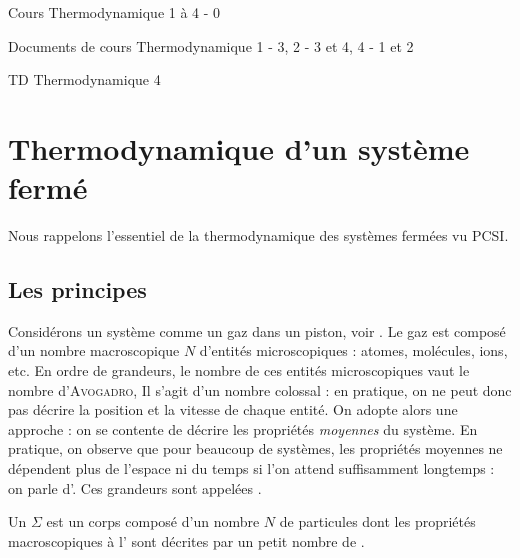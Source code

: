 \documentclass[12pt,fancy]{cours}
\begin{document}
{
\item Cours Thermodynamique 1 à 4 - 0
\item Documents de cours Thermodynamique 1 - 3, 2 - 3 et 4, 4 - 1 et 2
\item TD Thermodynamique 4
}





\section{Thermodynamique d'un système fermé}

Nous rappelons l'essentiel de la thermodynamique des systèmes fermées vu PCSI.

\subsection{Les principes}


Considérons un système comme un gaz dans un piston, voir . Le gaz est composé d'un nombre macroscopique $N$ d'entités microscopiques : atomes, molécules, ions, etc. En ordre de grandeurs, le nombre de ces entités microscopiques vaut le nombre d’\textsc{Avogadro},
Il s’agit d’un nombre colossal : en pratique, on ne peut donc pas décrire la position et la vitesse  de chaque entité. On adopte alors une approche  : on se contente de décrire les propriétés \emph{moyennes} du système. En pratique, on observe que pour beaucoup de systèmes, les propriétés moyennes ne dépendent plus de l’espace ni du temps si l’on attend suffisamment longtemps : on parle d’. Ces grandeurs sont appelées .

\begin{definition}\label{def:}
  Un  $\Sigma$ est un corps composé d'un nombre $N$ de particules  dont les propriétés macroscopiques à l' sont décrites par un petit nombre de .
\end{definition}
\end{document}
